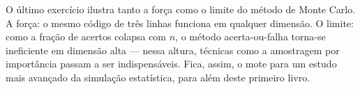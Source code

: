 \documentclass[
  portuguese,
  11pt,
  openany]{book}
\begin{document}
O último exercício ilustra tanto a força como o limite do método de Monte Carlo.
A força: o mesmo código de três linhas funciona em qualquer dimensão. O limite:
como a fração de acertos colapsa com \(n\), o método acerta-ou-falha torna-se
ineficiente em dimensão alta --- nessa altura, técnicas como a amostragem por
importância passam a ser indispensáveis. Fica, assim, o mote para um estudo mais
avançado da simulação estatística, para além deste primeiro livro.
\end{document}
